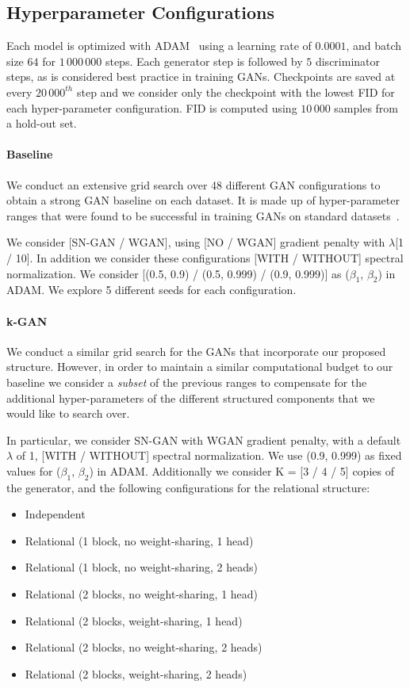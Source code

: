 \documentclass{article}
\begin{document}
\subsection{Hyperparameter Configurations}
Each model is optimized with ADAM~\citep{kingma2015adam} using a learning rate of $0.0001$, and batch size $64$ for $1\,000\,000$ steps.
Each generator step is followed by $5$ discriminator steps, as is considered best practice in training GANs.
Checkpoints are saved at every $20\,000^{th}$ step and we consider only the checkpoint with the lowest FID for each hyper-parameter configuration.
FID is computed using $10\,000$ samples from a hold-out set.

\paragraph{Baseline}
We conduct an extensive grid search over 48 different GAN configurations to obtain a strong GAN baseline on each dataset.
It is made up of hyper-parameter ranges that were found to be successful in training GANs on standard datasets~\citep{kurach2018gan}.

We consider [SN-GAN / WGAN], using [NO / WGAN] gradient penalty with $\lambda$[1 / 10].
In addition we consider these configurations [WITH / WITHOUT] spectral normalization.
We consider [(0.5, 0.9) / (0.5, 0.999) / (0.9, 0.999)] as ($\beta_1$, $\beta_2$) in ADAM.
We explore 5 different seeds for each configuration.

\paragraph{k-GAN}
We conduct a similar grid search for the GANs that incorporate our proposed structure.
However, in order to maintain a similar computational budget to our baseline we consider a \emph{subset} of the previous ranges to compensate for the additional hyper-parameters of the different structured components that we would like to search over.

In particular, we consider SN-GAN with WGAN gradient penalty, with a default $\lambda$ of 1, [WITH / WITHOUT] spectral normalization.
We use (0.9, 0.999) as fixed values for ($\beta_1$, $\beta_2$) in ADAM.
Additionally we consider K = [3 / 4 / 5] copies of the generator, and the following configurations for the relational structure:

\begin{itemize}
    \item Independent
    \item Relational (1 block, no weight-sharing, 1 head)
    \item Relational (1 block, no weight-sharing, 2 heads)
    \item Relational (2 blocks, no weight-sharing, 1 head)
    \item Relational (2 blocks, weight-sharing, 1 head)
    \item Relational (2 blocks, no weight-sharing, 2 heads)
    \item Relational (2 blocks, weight-sharing, 2 heads)
\end{itemize}
\end{document}
